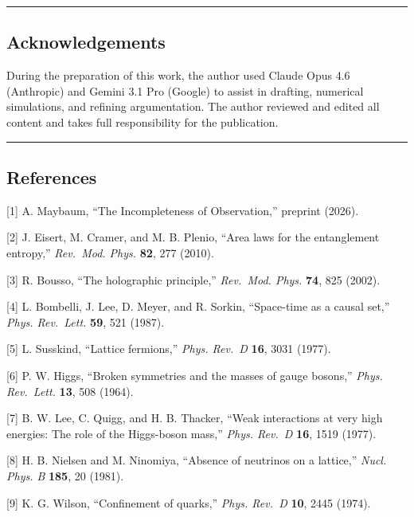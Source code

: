 \documentclass[
  11pt,
]{article}
\begin{document}
\begin{center}\rule{0.5\linewidth}{0.5pt}\end{center}

\hypertarget{acknowledgements}{%
\subsection{Acknowledgements}\label{acknowledgements}}

During the preparation of this work, the author used Claude Opus 4.6
(Anthropic) and Gemini 3.1 Pro (Google) to assist in drafting, numerical
simulations, and refining argumentation. The author reviewed and edited
all content and takes full responsibility for the publication.

\begin{center}\rule{0.5\linewidth}{0.5pt}\end{center}

\hypertarget{references}{%
\subsection{References}\label{references}}

{[}1{]} A. Maybaum, ``The Incompleteness of Observation,'' preprint
(2026).

{[}2{]} J. Eisert, M. Cramer, and M. B. Plenio, ``Area laws for the
entanglement entropy,'' \emph{Rev.~Mod. Phys.} \textbf{82}, 277 (2010).

{[}3{]} R. Bousso, ``The holographic principle,'' \emph{Rev.~Mod. Phys.}
\textbf{74}, 825 (2002).

{[}4{]} L. Bombelli, J. Lee, D. Meyer, and R. Sorkin, ``Space-time as a
causal set,'' \emph{Phys. Rev.~Lett.} \textbf{59}, 521 (1987).

{[}5{]} L. Susskind, ``Lattice fermions,'' \emph{Phys. Rev.~D}
\textbf{16}, 3031 (1977).

{[}6{]} P. W. Higgs, ``Broken symmetries and the masses of gauge
bosons,'' \emph{Phys. Rev.~Lett.} \textbf{13}, 508 (1964).

{[}7{]} B. W. Lee, C. Quigg, and H. B. Thacker, ``Weak interactions at
very high energies: The role of the Higgs-boson mass,'' \emph{Phys.
Rev.~D} \textbf{16}, 1519 (1977).

{[}8{]} H. B. Nielsen and M. Ninomiya, ``Absence of neutrinos on a
lattice,'' \emph{Nucl. Phys. B} \textbf{185}, 20 (1981).

{[}9{]} K. G. Wilson, ``Confinement of quarks,'' \emph{Phys. Rev.~D}
\textbf{10}, 2445 (1974).
\end{document}
